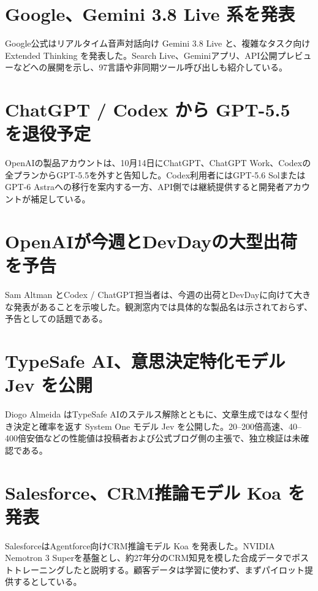 \section{Google、Gemini 3.8 Live 系を発表}
Google公式はリアルタイム音声対話向け Gemini 3.8 Live と、複雑なタスク向け Extended Thinking を発表した。Search Live、Geminiアプリ、API公開プレビューなどへの展開を示し、97言語や非同期ツール呼び出しも紹介している。

\section{ChatGPT / Codex から GPT-5.5 を退役予定}
OpenAIの製品アカウントは、10月14日にChatGPT、ChatGPT Work、Codexの全プランからGPT-5.5を外すと告知した。Codex利用者にはGPT-5.6 SolまたはGPT-6 Astraへの移行を案内する一方、API側では継続提供すると開発者アカウントが補足している。

\section{OpenAIが今週とDevDayの大型出荷を予告}
Sam Altman とCodex / ChatGPT担当者は、今週の出荷とDevDayに向けて大きな発表があることを示唆した。観測窓内では具体的な製品名は示されておらず、予告としての話題である。

\section{TypeSafe AI、意思決定特化モデル Jev を公開}
Diogo Almeida はTypeSafe AIのステルス解除とともに、文章生成ではなく型付き決定と確率を返す System One モデル Jev を公開した。20--200倍高速、40--400倍安価などの性能値は投稿者および公式ブログ側の主張で、独立検証は未確認である。

\section{Salesforce、CRM推論モデル Koa を発表}
SalesforceはAgentforce向けCRM推論モデル Koa を発表した。NVIDIA Nemotron 3 Superを基盤とし、約27年分のCRM知見を模した合成データでポストトレーニングしたと説明する。顧客データは学習に使わず、まずパイロット提供するとしている。

